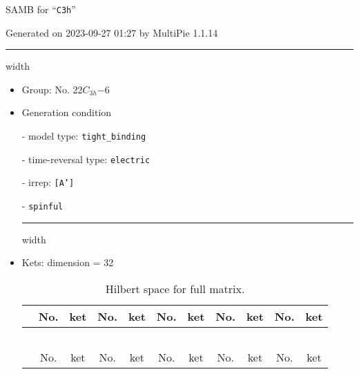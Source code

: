 \documentclass[fleqn,10pt,landscape]{article}
\begin{document}
\setcounter{MaxMatrixCols}{16}

\setlength{\baselineskip}{16pt}
\footnotesize
\begin{center}
\LARGE
SAMB for ``\texttt{C3h}''
\end{center}
\begin{flushright}
Generated on 2023-09-27 01:27 by MultiPie 1.1.14
\end{flushright}
\vspace{1cm}


 \hfil \hrule height 1mm width \textwidth \hfil

\begin{itemize}
\item Group: No. 22\quad$C_{3h}$\quad$-6$\quad[ hexagonal ]

\vspace{5mm}

\item Generation condition

\quad - model type: \texttt{tight_binding}

\quad - time-reversal type: \texttt{electric}

\quad - irrep: \texttt{[A']}

\quad - \texttt{spinful}


 \hfil \hrule height 1mm width \textwidth \hfil

\item Kets: dimension = 32
\begin{center}
\renewcommand{\arraystretch}{1.3}
\begin{longtable}{c|cc|cc|cc|cc|cc}
\caption{Hilbert space for full matrix.}
 \\
 \hline \hline
 & No. & ket & No. & ket & No. & ket & No. & ket & No. & ket \\ \hline \endfirsthead

\multicolumn{10}{l}{\tablename\ \thetable{}} \\
 \hline \hline
 & No. & ket & No. & ket & No. & ket & No. & ket & No. & ket \\ \hline \endhead


\end{longtable}
\end{center}
\end{itemize}
\end{document}
